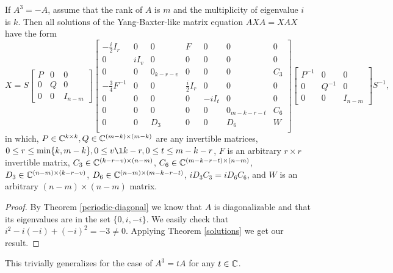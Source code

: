 \documentclass{article}
\begin{document}
\begin{theorem}
  If $A^3 = -A$, assume that the rank of $A$ is $m$ and the multiplicity of eigenvalue $i$ is $k$.
  Then all solutions of the Yang-Baxter-like matrix equation $A X A = X A X$ have the form
  \[X = S \begin{bmatrix} P & 0 & 0\\ 0 & Q & 0\\ 0 & 0 & I_{n - m} \end{bmatrix} \left[ \begin{array}{ccc|ccc|c} - \frac{i}{2} I_r & 0 & 0 & F & 0 & 0 & 0 \\ 0 & i I_v & 0 & 0 & 0 & 0 & 0 \\ 0 & 0 & 0_{k - r - v} & 0 & 0 & 0 & C_3 \\ \hline - \frac{3}{4} F^{-1} & 0 & 0 & \frac{i}{2} I_r & 0 & 0 & 0 \\ 0 & 0 & 0 & 0 & - i I_t & 0 & 0 \\ 0 & 0 & 0 & 0 & 0 & 0_{m - k - r - t} & C_6 \\ \hline 0 & 0 & D_3 & 0 & 0 & D_6 & W \\ \end{array} \right] \begin{bmatrix} P^{-1} & 0 & 0\\ 0 & Q^{-1} & 0\\ 0 & 0 & I_{n - m} \end{bmatrix} S^{-1},\]
  in which, $P \in \mathbb{C}^{k \times k}, Q \in \mathbb{C}^{(m - k) \times (m - k)}$ are any invertible matrices, $0 \le r \le \min \{k, m - k\}, 0 \le v \l k - r, 0 \le t \le m - k - r$, $F$ is an arbitrary $r \times r$ invertible matrix, $C_3 \in \mathbb{C}^{(k - r - v) \times (n - m)}$, $C_6 \in \mathbb{C}^{(m - k - r - t) \times (n - m)}$, $D_3 \in \mathbb{C}^{(n - m) \times (k - r - v)}$, $D_6 \in \mathbb{C}^{(n - m) \times (m - k - r - t)}$, $i D_3 C_3 = i D_6 C_6$, and $W$ is an arbitrary $(n - m) \times (n - m)$ matrix.
\end{theorem}

\begin{proof}
  By Theorem \ref{periodic-diagonal} we know that $A$ is diagonalizable and that its eigenvalues are in the set $\{0, i, - i\}$.
  We easily check that $i^2 - i (- i) + (- i)^2 = -3 \neq 0$.
  Applying Theorem \ref{solutions} we get our result.
\end{proof}

\begin{remark}
This trivially generalizes for the case of $A^3 = t A$ for any $t \in \mathbb{C}$.
\end{remark}
\end{document}
